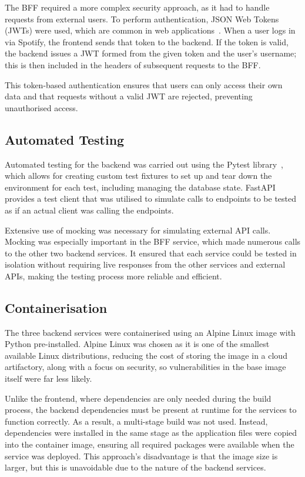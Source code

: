 The BFF required a more complex security approach, as it had to handle requests from external users. To perform authentication, JSON Web Tokens (JWTs) were used, which are common in web applications~\cite{9320801}. When a user logs in via Spotify, the frontend sends that token to the backend. If the token is valid, the backend issues a JWT formed from the given token and the user's username; this is then included in the headers of subsequent requests to the BFF.

This token-based authentication ensures that users can only access their own data and that requests without a valid JWT are rejected, preventing unauthorised access.

\subsection{Automated Testing}
Automated testing for the backend was carried out using the Pytest library~\cite{PyTest}, which allows for creating custom test fixtures to set up and tear down the environment for each test, including managing the database state. FastAPI provides a test client that was utilised to simulate calls to endpoints to be tested as if an actual client was calling the endpoints.

Extensive use of mocking was necessary for simulating external API calls. Mocking was especially important in the BFF service, which made numerous calls to the other two backend services. It ensured that each service could be tested in isolation without requiring live responses from the other services and external APIs, making the testing process more reliable and efficient.

\subsection{Containerisation}
The three backend services were containerised using an Alpine Linux image with Python pre-installed. Alpine Linux was chosen as it is one of the smallest available Linux distributions, reducing the cost of storing the image in a cloud artifactory, along with a focus on security, so vulnerabilities in the base image itself were far less likely.

Unlike the frontend, where dependencies are only needed during the build process, the backend dependencies must be present at runtime for the services to function correctly. As a result, a multi-stage build was not used. Instead, dependencies were installed in the same stage as the application files were copied into the container image, ensuring all required packages were available when the service was deployed. This approach's disadvantage is that the image size is larger, but this is unavoidable due to the nature of the backend services.

